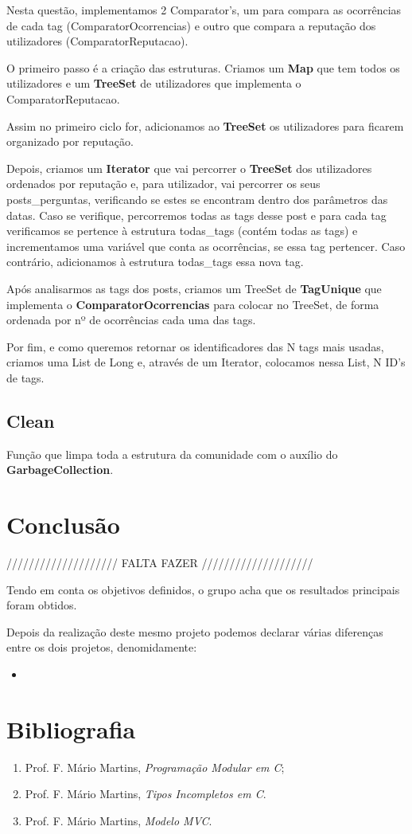 \documentclass[a4paper]{article}
\begin{document}
Nesta questão, implementamos 2 Comparator's, um para compara as ocorrências de 
cada tag (ComparatorOcorrencias) e outro que compara a reputação dos utilizadores 
(ComparatorReputacao).

O primeiro passo é a criação das estruturas. Criamos um \textbf{Map} que tem todos 
os utilizadores e um \textbf{TreeSet} de utilizadores que implementa o 
ComparatorReputacao.

Assim no primeiro ciclo for, adicionamos ao \textbf{TreeSet} os utilizadores para 
ficarem organizado por reputação.

Depois, criamos um \textbf{Iterator} que vai percorrer o \textbf{TreeSet} dos
utilizadores ordenados por reputação e, para utilizador, vai percorrer os seus
posts\_perguntas, verificando se estes se encontram dentro dos parâmetros das datas.
Caso se verifique, percorremos todas as tags desse post e para cada tag verificamos
se pertence à estrutura todas\_tags (contém todas as tags) e incrementamos uma
variável que conta as ocorrências, se essa tag pertencer. Caso contrário, 
adicionamos à estrutura todas\_tags essa nova tag.

Após analisarmos as tags dos posts, criamos um TreeSet de \textbf{TagUnique} que
implementa o \textbf{ComparatorOcorrencias} para colocar no TreeSet, de forma
ordenada por nº de ocorrências cada uma das tags.

Por fim, e como queremos retornar os identificadores das N tags mais usadas, criamos
uma List de Long e, através de um Iterator, colocamos nessa List, N ID's de tags.

\subsection{Clean}

Função que limpa toda a estrutura da comunidade com o auxílio do 
\textbf{GarbageCollection}.

\section{Conclusão}
\label{sec:conclusao}

//////////////////// FALTA FAZER ////////////////////

Tendo em conta os objetivos definidos, o grupo acha que os resultados 
principais foram obtidos. 

Depois da realização deste mesmo projeto podemos declarar várias diferenças
entre os dois projetos, denomidamente:

\begin{itemize}
  \item 
\end{itemize}


\section{Bibliografia}

\begin{enumerate} 
	\item Prof. F. Mário Martins, \textit{Programação Modular em C};
	\item Prof. F. Mário Martins, \textit{Tipos Incompletos em C}.
  \item Prof. F. Mário Martins, \textit{Modelo MVC}.
\end{enumerate}
\end{document}
